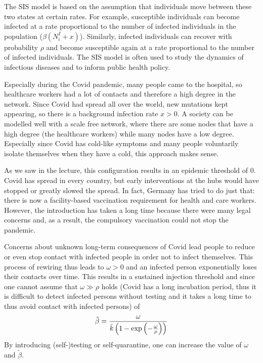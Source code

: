 \documentclass{article}
\begin{document}
	The SIS model is based on the assumption that individuals move between these two states at certain rates. For example, susceptible individuals can become infected at a rate proportional to the number of infected individuals in the population ($\beta(N_i^I + x)$). Similarly, infected individuals can recover with probability $\rho$ and become susceptible again at a rate proportional to the number of infected individuals. The SIS model is often used to study the dynamics of infectious diseases and to inform public health policy. \cite{noauthor_sir-modell_2022}
	
	Especially during the Covid pandemic, many people came to the hospital, so healthcare workers had a lot of contacts and therefore a high degree in the network. Since Covid had spread all over the world, new mutations kept appearing, so there is a background infection rate $x > 0$. A society can be modelled well with a scale free network, where there are some nodes that have a high degree (the healthcare workers) while many nodes have a low degree. Especially since Covid has cold-like symptoms and many people voluntarily isolate themselves when they have a cold, this approach makes sense.
	
	As we saw in the lecture, this configuration results in an epidemic threshold of 0. Covid has spread in every country, but early interventions at the hubs would have stopped or greatly slowed the spread. In fact, Germany has tried to do just that: there is now a facility-based vaccination requirement for health and care workers. However, the introduction has taken a long time because there were many legal concerns and, as a result, the compulsory vaccination could not stop the pandemic. \cite{noauthor_corona-pandemie_2022} \cite{noauthor_informationen_nodate}
	
	Concerns about unknown long-term consequences of Covid lead people to reduce or even stop contact with infected people in order not to infect themselves. This process of rewiring thus leads to $\omega > 0$ and an infected person exponentially loses their contacts over time. This results in a sustained injection threshold and since one cannot assume that $\omega \gg \rho$ holds (Covid has a long incubation period, thus it is difficult to detect infected persons without testing and it takes a long time to thus avoid contact with infected persons) of 
	\begin{align}
		\tilde{\beta} = \frac{\omega}{\bar{k}\left(1-\exp\left(-\frac{\omega}{\rho}\right)\right)} \notag
	\end{align}
	By introducing (self-)testing or self-quarantine, one can increase the value of $\omega$ and $\tilde{\beta}$.
	
\end{document}
